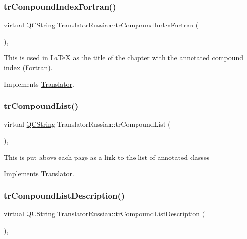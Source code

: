 \subsubsection{\texorpdfstring{trCompoundIndexFortran()}{trCompoundIndexFortran()}}
{\footnotesize\ttfamily virtual \mbox{\hyperlink{class_q_c_string}{Q\+C\+String}} Translator\+Russian\+::tr\+Compound\+Index\+Fortran (\begin{DoxyParamCaption}{ }\end{DoxyParamCaption})\hspace{0.3cm}{\ttfamily [inline]}, {\ttfamily [virtual]}}

This is used in La\+TeX as the title of the chapter with the annotated compound index (Fortran). 

Implements \mbox{\hyperlink{class_translator}{Translator}}.

\mbox{\label{class_translator_russian_a8140f1b15c13f8f26ff51aa99a6e3080}} 
\subsubsection{\texorpdfstring{trCompoundList()}{trCompoundList()}}
{\footnotesize\ttfamily virtual \mbox{\hyperlink{class_q_c_string}{Q\+C\+String}} Translator\+Russian\+::tr\+Compound\+List (\begin{DoxyParamCaption}{ }\end{DoxyParamCaption})\hspace{0.3cm}{\ttfamily [inline]}, {\ttfamily [virtual]}}

This is put above each page as a link to the list of annotated classes 

Implements \mbox{\hyperlink{class_translator}{Translator}}.

\mbox{\label{class_translator_russian_afa6a70f61df0441470daa767678be1a8}} 
\subsubsection{\texorpdfstring{trCompoundListDescription()}{trCompoundListDescription()}}
{\footnotesize\ttfamily virtual \mbox{\hyperlink{class_q_c_string}{Q\+C\+String}} Translator\+Russian\+::tr\+Compound\+List\+Description (\begin{DoxyParamCaption}{ }\end{DoxyParamCaption})\hspace{0.3cm}{\ttfamily [inline]}, {\ttfamily [virtual]}}

